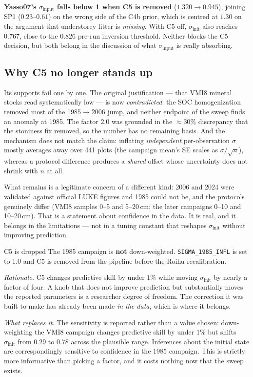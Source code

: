 \documentclass[11pt]{article}
\newcommand{\sinit}{\sigma_{\mathrm{init}}}
\newcommand{\sinput}{\sigma_{\mathrm{input}}}
\begin{document}
\begin{caveat}
\textbf{Yasso07's $\sinput$ falls below 1 when C5 is removed} ($1.320 \rightarrow 0.945$),
joining SP1 ($0.23$--$0.61$) on the wrong side of the C4b prior, which is centred at $1.30$ on
the argument that understorey litter is \emph{missing}. With C5 off, $\sinit$ also reaches
$0.767$, close to the $0.826$ pre-run inversion threshold. Neither blocks the C5 decision, but
both belong in the discussion of what $\sinput$ is really absorbing.
\end{caveat}

\subsection{Why C5 no longer stands up}
Its supports fail one by one. The original justification --- that VMI8 mineral stocks read
systematically low --- is now \emph{contradicted}: the SOC homogenization removed most of the
1985$\rightarrow$2006 jump, and neither endpoint of the sweep finds an anomaly at 1985. The
factor $2.0$ was grounded in the $\approx 30\%$ discrepancy that the stoniness fix removed, so
the number has no remaining basis. And the mechanism does not match the claim: inflating
\emph{independent} per-observation $\sigma$ mostly averages away over 441 plots (the campaign
mean's SE scales as $\sigma/\sqrt{n}$), whereas a protocol difference produces a \emph{shared}
offset whose uncertainty does not shrink with $n$ at all.

What remains is a legitimate concern of a different kind: 2006 and 2024 were validated against
official LUKE figures and 1985 could not be, and the protocols genuinely differ (VMI8 samples
0--5 and 5--20\,cm; the later campaigns 0--10 and 10--20\,cm). That is a statement about
confidence in the data. It is real, and it belongs in the limitations --- not in a tuning
constant that reshapes $\sinit$ without improving prediction.

\begin{decision}{C5 is dropped}
The 1985 campaign is \textbf{not} down-weighted. \texttt{SIGMA\_1985\_INFL} is set to 1.0 and
C5 is removed from the pipeline before the Roihu recalibration.

\smallskip
\emph{Rationale.} C5 changes predictive skill by under $1\%$ while moving $\sinit$ by nearly a
factor of four. A knob that does not improve prediction but substantially moves the reported
parameters is a researcher degree of freedom. The correction it was built to make has already
been made \emph{in the data}, which is where it belongs.

\smallskip
\emph{What replaces it.} The sensitivity is reported rather than a value chosen: down-weighting
the VMI8 campaign changes predictive skill by under $1\%$ but shifts $\sinit$ from $0.29$ to
$0.78$ across the plausible range. Inferences about the initial state are correspondingly
sensitive to confidence in the 1985 campaign. This is strictly more informative than picking a
factor, and it costs nothing now that the sweep exists.
\end{decision}
\end{document}
